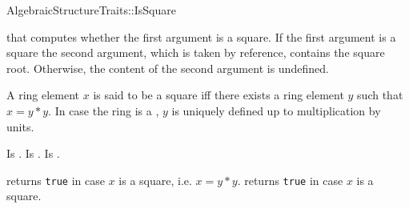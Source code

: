 

\begin{ccRefFunctionObjectConcept}{AlgebraicStructureTraits::IsSquare}

\ccDefinition

 that computes whether the first argument is a square. 
If the first argument is a square the second argument, which is taken by reference, contains the square root. 
Otherwise, the content of the second argument is undefined. 

A ring element $x$ is said to be a square iff there exists a ring element $y$ such
that $x= y*y$. In case the ring is a ,
$y$ is uniquely defined up to multiplication by units. \\


\ccRefines 


\ccTypes
{} 
        { Is .}
\ccGlue
{} 
        { Is .}
\ccGlue
{} 
        { Is .}

\ccOperations
{}

        { returns {\tt true} in case $x$ is a square, i.e. $x = y*y$.
        }
        { returns {\tt true} in case $x$ is a square.
        }


\ccSeeAlso


\end{ccRefFunctionObjectConcept} 
